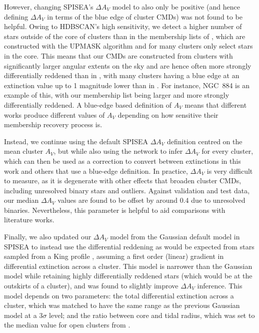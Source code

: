 However, changing SPISEA's $\Delta A_V$ model to also only be positive (and hence defining $\Delta A_V$ in terms of the blue edge of cluster CMDs) was not found to be helpful. Owing to HDBSCAN's high sensitivity, we detect a higher number of stars outside of the core of clusters than in the membership lists of \cite{cantat-gaudin_clusters_2020}, which are constructed with the UPMASK algorithm \citep{krone-martins_upmask:_2014} and for many clusters only select stars in the core. This means that our CMDs are constructed from clusters with significantly larger angular extents on the sky and are hence often more strongly differentially reddened than in \cite{cantat-gaudin_clusters_2020}, with many clusters having a blue edge at an extinction value up to 1 magnitude lower than in \cite{cantat-gaudin_clusters_2020}. For instance, NGC~884 is an example of this, with our membership list being larger and more strongly differentially reddened. A blue-edge based definition of $A_V$ means that different works produce different values of $A_V$ depending on how sensitive their membership recovery process is.

Instead, we continue using the default SPISEA $\Delta A_V$ definition centred on the mean cluster $A_V$, but while also using the network to infer $\Delta A_V$ for every cluster, which can then be used as a correction to convert between extinctions in this work and others that use a blue-edge definition. In practice, $\Delta A_V$ is very difficult to measure, as it is degenerate with other effects that broaden cluster CMDs, including unresolved binary stars and outliers. Against validation and test data, our median $\Delta A_V$ values are found to be offset by around 0.4 due to unresolved binaries. Nevertheless, this parameter is helpful to aid comparisons with literature works.

Finally, we also updated our $\Delta A_V$ model from the Gaussian default model in SPISEA to instead use the differential reddening as would be expected from stars sampled from a King profile \citep{king_structure_star_1962}, assuming a first order (linear) gradient in differential extinction across a cluster. This model is narrower than the Gaussian model while retaining highly differentially reddened stars (which would be at the outskirts of a cluster), and was found to slightly improve $\Delta A_V$ inference. This model depends on two parameters: the total differential extinction across a cluster, which was matched to have the same range as the previous Gaussian model at a $3\sigma$ level; and the ratio between core and tidal radius, which was set to the median value for open clusters from \cite{kharchenko_global_2013}.

